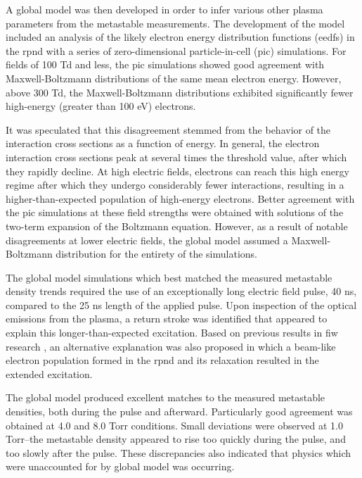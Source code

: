 A global model was then developed in order to infer various other plasma
parameters from the metastable measurements. The development of the model
included an analysis of the likely electron energy distribution functions
(\acs{eedf}s) in the \acs{rpnd} with a series of zero-dimensional
particle-in-cell (\acs{pic}) simulations. For fields of 100 Td and less, the
\acs{pic} simulations showed good agreement with Maxwell-Boltzmann distributions
of the same mean electron energy. However, above 300 Td, the Maxwell-Boltzmann
distributions exhibited significantly fewer high-energy (greater than 100 eV)
electrons.

It was speculated that this disagreement stemmed from the behavior of the
interaction cross sections as a function of energy. In general, the electron
interaction cross sections peak at several times the threshold value, after
which they rapidly decline. At high electric fields, electrons can reach this
high energy regime after which they undergo considerably fewer interactions,
resulting in a higher-than-expected population of high-energy electrons. Better
agreement with the \acs{pic} simulations at these field strengths were obtained
with solutions of the two-term expansion of the Boltzmann equation. However, as
a result of notable disagreements at lower electric fields, the global model
assumed a Maxwell-Boltzmann distribution for the entirety of the simulations.

The global model simulations which best matched the measured metastable density
trends required the use of an exceptionally long electric field pulse, 40 ns,
compared to the 25 ns length of the applied pulse. Upon inspection of the
optical emissions from the plasma, a return stroke was identified that appeared
to explain this longer-than-expected excitation. Based on previous results in
\acs{fiw} research \cite{Starikovskaia1998, Starikovskaia2001}, an alternative
explanation was also proposed in which a beam-like electron population formed in
the \acs{rpnd} and its relaxation resulted in the extended excitation.

The global model produced excellent matches to the measured metastable
densities, both during the pulse and afterward. Particularly good agreement was
obtained at 4.0 and 8.0 Torr conditions. Small deviations were observed at 1.0
Torr--the metastable density appeared to rise too quickly during the pulse, and
too slowly after the pulse. These discrepancies also indicated that physics
which were unaccounted for by global model was occurring.


